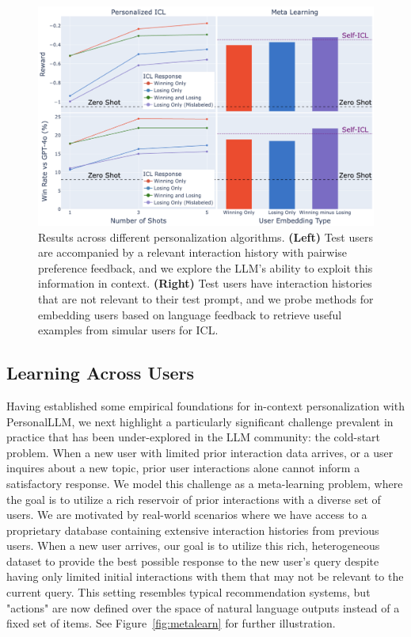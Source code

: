 \begin{figure}[!ht]
    \centering
    \includegraphics[width=\textwidth]{../figures/fig6sharp.png}
    \caption{Results across different personalization algorithms. 
    \textbf{(Left)} Test users are accompanied by a relevant interaction history with pairwise preference feedback, and we explore the LLM's ability to exploit this information in context. 
    \textbf{(Right)} Test users have interaction histories that are not relevant to their test prompt, and we probe methods for embedding users based on language feedback to retrieve useful examples from simular users for ICL.}
    \label{fig:exp_results}
\end{figure}


\subsection{Learning Across Users}

Having established some empirical foundations for in-context personalization with \textsf{PersonalLLM}, we next highlight a particularly significant challenge prevalent in practice that has been under-explored in the LLM community: the cold-start problem. 
When a new user with limited prior interaction data arrives, or a user inquires about a new topic, prior user interactions alone cannot inform a satisfactory response.
We model this challenge as a meta-learning problem, where the goal is to utilize a rich reservoir of prior interactions with a diverse set of users. 
We are motivated by real-world scenarios where we have access to a proprietary database containing extensive interaction histories from previous users. 
When a new user arrives, our goal is to utilize this rich, heterogeneous dataset to provide the best possible response to the new user's query despite having only limited initial interactions with them that may not be relevant to the current query. 
This setting resembles typical recommendation systems, but "actions" are now defined over the space of natural language outputs instead of a fixed set of items.
See Figure~\ref{fig:metalearn} for further illustration.

